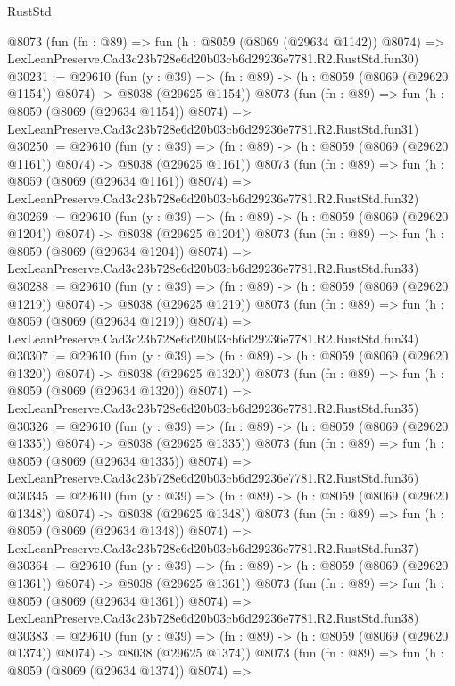 \begin{lexlean}{RustStd}
\begin{coremodule}
    @8073
    (fun (fn : @89) =>
    fun (h : @8059 (@8069 (@29634 @1142)) @8074) =>
    LexLeanPreserve.Cad3c23b728e6d20b03cb6d29236e7781.R2.RustStd.fun30)
@30231 := @29610
    (fun (y : @39) =>
    (fn : @89) -> (h : @8059 (@8069 (@29620 @1154)) @8074) -> @8038 (@29625 @1154))
    @8073
    (fun (fn : @89) =>
    fun (h : @8059 (@8069 (@29634 @1154)) @8074) =>
    LexLeanPreserve.Cad3c23b728e6d20b03cb6d29236e7781.R2.RustStd.fun31)
@30250 := @29610
    (fun (y : @39) =>
    (fn : @89) -> (h : @8059 (@8069 (@29620 @1161)) @8074) -> @8038 (@29625 @1161))
    @8073
    (fun (fn : @89) =>
    fun (h : @8059 (@8069 (@29634 @1161)) @8074) =>
    LexLeanPreserve.Cad3c23b728e6d20b03cb6d29236e7781.R2.RustStd.fun32)
@30269 := @29610
    (fun (y : @39) =>
    (fn : @89) -> (h : @8059 (@8069 (@29620 @1204)) @8074) -> @8038 (@29625 @1204))
    @8073
    (fun (fn : @89) =>
    fun (h : @8059 (@8069 (@29634 @1204)) @8074) =>
    LexLeanPreserve.Cad3c23b728e6d20b03cb6d29236e7781.R2.RustStd.fun33)
@30288 := @29610
    (fun (y : @39) =>
    (fn : @89) -> (h : @8059 (@8069 (@29620 @1219)) @8074) -> @8038 (@29625 @1219))
    @8073
    (fun (fn : @89) =>
    fun (h : @8059 (@8069 (@29634 @1219)) @8074) =>
    LexLeanPreserve.Cad3c23b728e6d20b03cb6d29236e7781.R2.RustStd.fun34)
@30307 := @29610
    (fun (y : @39) =>
    (fn : @89) -> (h : @8059 (@8069 (@29620 @1320)) @8074) -> @8038 (@29625 @1320))
    @8073
    (fun (fn : @89) =>
    fun (h : @8059 (@8069 (@29634 @1320)) @8074) =>
    LexLeanPreserve.Cad3c23b728e6d20b03cb6d29236e7781.R2.RustStd.fun35)
@30326 := @29610
    (fun (y : @39) =>
    (fn : @89) -> (h : @8059 (@8069 (@29620 @1335)) @8074) -> @8038 (@29625 @1335))
    @8073
    (fun (fn : @89) =>
    fun (h : @8059 (@8069 (@29634 @1335)) @8074) =>
    LexLeanPreserve.Cad3c23b728e6d20b03cb6d29236e7781.R2.RustStd.fun36)
@30345 := @29610
    (fun (y : @39) =>
    (fn : @89) -> (h : @8059 (@8069 (@29620 @1348)) @8074) -> @8038 (@29625 @1348))
    @8073
    (fun (fn : @89) =>
    fun (h : @8059 (@8069 (@29634 @1348)) @8074) =>
    LexLeanPreserve.Cad3c23b728e6d20b03cb6d29236e7781.R2.RustStd.fun37)
@30364 := @29610
    (fun (y : @39) =>
    (fn : @89) -> (h : @8059 (@8069 (@29620 @1361)) @8074) -> @8038 (@29625 @1361))
    @8073
    (fun (fn : @89) =>
    fun (h : @8059 (@8069 (@29634 @1361)) @8074) =>
    LexLeanPreserve.Cad3c23b728e6d20b03cb6d29236e7781.R2.RustStd.fun38)
@30383 := @29610
    (fun (y : @39) =>
    (fn : @89) -> (h : @8059 (@8069 (@29620 @1374)) @8074) -> @8038 (@29625 @1374))
    @8073
    (fun (fn : @89) =>
    fun (h : @8059 (@8069 (@29634 @1374)) @8074) =>

\end{coremodule}
\end{lexlean}
